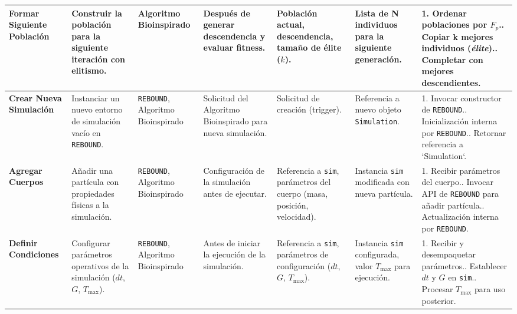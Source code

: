 \begin{landscape}
{\begin{longtable}{@{}p{5cm} p{3cm} p{2.5cm} p{2.5cm} p{2.5cm} p{3cm} p{4cm}@{}}
        \textbf{Formar Siguiente Población} & Construir la población para la siguiente iteración con elitismo. & Algoritmo Bioinspirado & Después de generar descendencia y evaluar fitness. & Población actual, descendencia, tamaño de élite ($k$). & Lista de N individuos para la siguiente generación. & 1. Ordenar poblaciones por $F_p$.\newline 2. Copiar k mejores individuos (\textit{élite}).\newline 3. Completar con mejores descendientes. \\
        \midrule

        \textbf{Crear Nueva Simulación} & Instanciar un nuevo entorno de simulación vacío en \texttt{REBOUND}. & \texttt{REBOUND}, Algoritmo Bioinspirado & Solicitud del Algoritmo Bioinspirado para nueva simulación. & Solicitud de creación (trigger). & Referencia a nuevo objeto \texttt{Simulation}. & 1. Invocar constructor de \texttt{REBOUND}.\newline 2. Inicialización interna por \texttt{REBOUND}.\newline 3. Retornar referencia a `Simulation`. \\
        \midrule

        \textbf{Agregar Cuerpos} & Añadir una partícula con propiedades físicas a la simulación. & \texttt{REBOUND}, Algoritmo Bioinspirado & Configuración de la simulación antes de ejecutar. & Referencia a \texttt{sim}, parámetros del cuerpo (masa, posición, velocidad). & Instancia \texttt{sim} modificada con nueva partícula. & 1. Recibir parámetros del cuerpo.\newline 2. Invocar API de \texttt{REBOUND} para añadir partícula.\newline 3. Actualización interna por \texttt{REBOUND}. \\
        \midrule

        \textbf{Definir Condiciones} & Configurar parámetros operativos de la simulación ($dt$, $G$, $T_{\max}$). & \texttt{REBOUND}, Algoritmo Bioinspirado & Antes de iniciar la ejecución de la simulación. & Referencia a \texttt{sim}, parámetros de configuración ($dt$, $G$, $T_{\max}$). & Instancia \texttt{sim} configurada, valor $T_{\max}$ para ejecución. & 1. Recibir y desempaquetar parámetros.\newline 2. Establecer $dt$ y $G$ en \texttt{sim}.\newline 3. Procesar $T_{\max}$ para uso posterior. \\
        \midrule


\end{longtable}}
\end{landscape}

